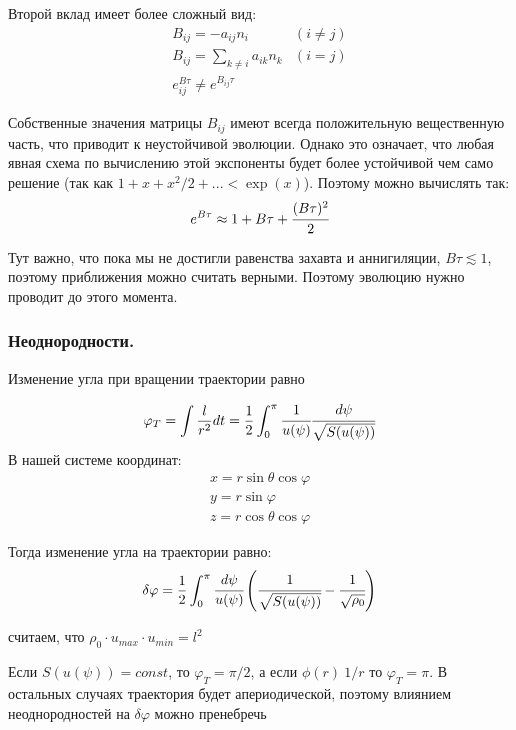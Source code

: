 \documentclass[a4paper, 14pt]{article}
\begin{document}
Второй вклад имеет более сложный вид:
\begin{eqnarray*}
	B_{ij} = -a_{ij} n_i & ( i \ne j)\\
	B_{ij} = \sum_{k \neq i}{a_{ik} n_k} & (i = j)  \\
	e^{B \tau}_{ij} \ne e^{B_{ij} \tau}
\end{eqnarray*}

Собственные значения матрицы $B_{ij}$ имеют всегда положительную вещественную часть, что приводит к неустойчивой эволюции. Однако это означает, что любая явная схема по вычислению этой экспоненты будет более устойчивой чем само решение (так как $1+x+x^2/2+... < \exp(x)$). Поэтому можно вычислять так:
\begin{eqnarray*}
	e^{B \tau} \approx 1 + B \tau + \cfrac{(B \tau)^2}{2}
\end{eqnarray*}

Тут важно, что пока мы не достигли равенства захавта и аннигиляции, $B \tau \lesssim 1$, поэтому приближения можно считать верными. Поэтому эволюцию нужно проводит до этого момента.


\subsubsection{Неоднородности.}

Изменение угла при вращении траектории равно

\begin{equation*}
	\varphi_{T} = \int {\frac{l}{r^2} dt} =  \frac{1}{2}\int_{0}^{\pi} {
		\cfrac{1}{u(\psi)} \cfrac{d\psi}{\sqrt{S(u(\psi))}}}
\end{equation*}
В нашей системе координат: 
\begin{eqnarray*}
	x = r \sin{\theta} \cos{\varphi}
	\\
	y = r \sin{\varphi}
	\\
	z = r \cos{\theta} \cos{\varphi}
\end{eqnarray*}

Тогда изменение угла на траектории равно:
\begin{equation*}
\delta \varphi  =  \frac{1}{2}\int_{0}^{\pi} {
	\cfrac{d\psi}{u(\psi)} \left(\cfrac{1}{\sqrt{S(u(\psi))}} -\cfrac{1}{\sqrt{\rho_0}}   \right)}
\end{equation*}

считаем, что $\rho_0 \cdot u_{max}\cdot u_{min} = l^2$

Если $S(u(\psi)) = const$, то $\varphi_{T} = \pi/2$, а если $\phi(r) ~ 1/r$ то  $\varphi_{T} = \pi$. В остальных случаях траектория будет апериодической, поэтому  влиянием неоднородностей на $\delta \varphi$ можно пренебречь
\end{document}
